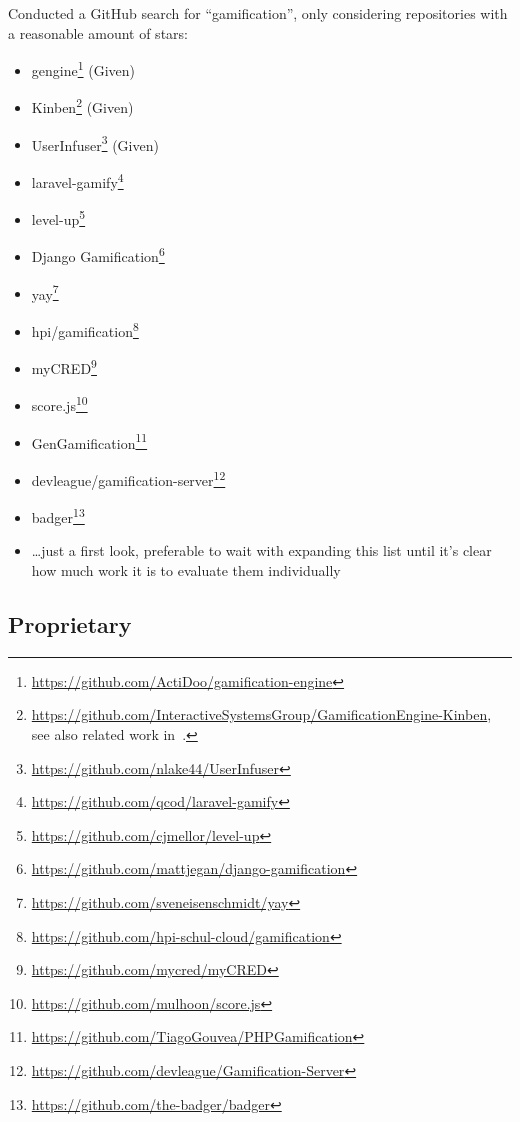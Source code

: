\documentclass[runningheads]{llncs}
\begin{document}
Conducted a GitHub search for \enquote{gamification}, only considering repositories with a reasonable amount of stars:
\begin{itemize}
    \item gengine\footnote{\url{https://github.com/ActiDoo/gamification-engine}} (Given)
    \item Kinben\footnote{\url{https://github.com/InteractiveSystemsGroup/GamificationEngine-Kinben}, see also related work in~\cite{KiKZ18}.} (Given)
    \item UserInfuser\footnote{\url{https://github.com/nlake44/UserInfuser}} (Given)
    \item laravel-gamify\footnote{\url{https://github.com/qcod/laravel-gamify}}
    \item level-up\footnote{\url{https://github.com/cjmellor/level-up}}
    \item Django Gamification\footnote{\url{https://github.com/mattjegan/django-gamification}}
    \item yay\footnote{\url{https://github.com/sveneisenschmidt/yay}}
    \item hpi/gamification\footnote{\url{https://github.com/hpi-schul-cloud/gamification}}
    \item myCRED\footnote{\url{https://github.com/mycred/myCRED}}
    \item score.js\footnote{\url{https://github.com/mulhoon/score.js}}
    \item GenGamification\footnote{\url{https://github.com/TiagoGouvea/PHPGamification}}
    \item devleague/gamification-server\footnote{\url{https://github.com/devleague/Gamification-Server}}
    \item badger\footnote{\url{https://github.com/the-badger/badger}}
    \item \ldots just a first look, preferable to wait with expanding this list until it's clear how much work it is to evaluate them individually
\end{itemize}

\subsection{Proprietary}
\end{document}
